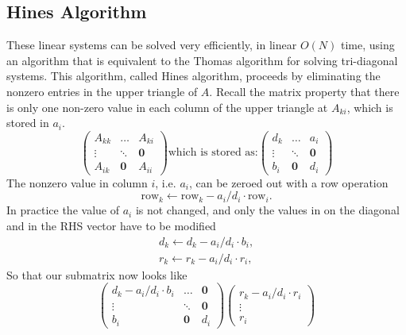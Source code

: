 \subsection{Hines Algorithm}
\label{sec:hines}
These linear systems can be solved very efficiently, in linear $O(N)$ time, using an algorithm that is equivalent to the Thomas algorithm for solving tri-diagonal systems. This algorithm, called Hines algorithm, proceeds by eliminating the nonzero entries in the upper triangle of $A$. Recall the matrix property that there is only one non-zero value in each column of the upper triangle at $A_{ki}$, which is stored in $a_i$.
\begin{equation*}
\left(
        \begin{array}{ccc}
            A_{kk} & \dots      & A_{ki} \\
        \vdots     & \ddots     & \mathbf{0} \\
            A_{ik} & \mathbf{0} & A_{ii}
        \end{array}
\right)
\text{which is stored as:}
\left(
        \begin{array}{ccc}
            d_k & \dots      & a_i \\
        \vdots  & \ddots     & \mathbf{0} \\
            b_i & \mathbf{0} & d_i
        \end{array}
\right)
\end{equation*}
The nonzero value in column $i$, i.e. $a_i$, can be zeroed out with a row operation
\begin{equation*}
    \text{row}_k \leftarrow \text{row}_k - a_i/d_i\cdot\text{row}_i.
\end{equation*}
In practice the value of $a_i$ is not changed, and only the values in on the diagonal and in the RHS vector have to be modified
\begin{align}
d_k \leftarrow d_k - a_i/d_i\cdot b_i, \nonumber \\
r_k \leftarrow r_k - a_i/d_i\cdot r_i, \nonumber
\end{align}
So that our submatrix now looks like
\begin{equation*}
\left(
        \begin{array}{ccc}
            d_k - a_i/d_i\cdot b_i  & \dots      & \mathbf{0} \\
        \vdots                      & \ddots     & \mathbf{0} \\
            b_i                     & \mathbf{0} & d_i
        \end{array}
\right)
\left(
        \begin{array}{c}
            r_k - a_i/d_i\cdot r_i \\
        \vdots                     \\
            r_i
        \end{array}
\right)
\end{equation*}


